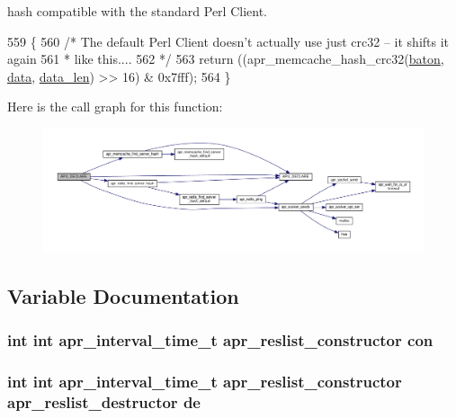hash compatible with the standard Perl Client. 
\begin{DoxyCode}
559 \{
560     \textcolor{comment}{/* The default Perl Client doesn't actually use just crc32 -- it shifts it again}
561 \textcolor{comment}{     * like this....}
562 \textcolor{comment}{     */}
563     \textcolor{keywordflow}{return} ((apr\_memcache\_hash\_crc32(\hyperlink{group__APACHE__CORE__MPM_ga3b2abf82e64753cd3564882d9ad8eb86}{baton}, \hyperlink{structdata}{data}, \hyperlink{group__APR__Util__MC_ga371e964d98d4000f4bc080fa4ad81902}{data\_len}) >> 16) & 0x7fff);
564 \}
\end{DoxyCode}


Here is the call graph for this function\+:
\nopagebreak
\begin{figure}[H]
\begin{center}
\leavevmode
\includegraphics[width=350pt]{group__APR__Util__RL_ga81a7e5b310111b6c666aa89b36be6e14_cgraph}
\end{center}
\end{figure}




\subsection{Variable Documentation}
\subsubsection[{\texorpdfstring{con}{con}}]{ {\bf int} {\bf int} {\bf apr\+\_\+interval\+\_\+time\+\_\+t} {\bf apr\+\_\+reslist\+\_\+constructor} con}\hypertarget{group__APR__Util__RL_ga78a9bc213e38a23acef3b56261062e3a}{}\label{group__APR__Util__RL_ga78a9bc213e38a23acef3b56261062e3a}
\subsubsection[{\texorpdfstring{de}{de}}]{ {\bf int} {\bf int} {\bf apr\+\_\+interval\+\_\+time\+\_\+t} {\bf apr\+\_\+reslist\+\_\+constructor} {\bf apr\+\_\+reslist\+\_\+destructor} de}\hypertarget{group__APR__Util__RL_gab07bdd2ad15e8bf3e26dd0ca7a09c2b9}{}\label{group__APR__Util__RL_gab07bdd2ad15e8bf3e26dd0ca7a09c2b9}
